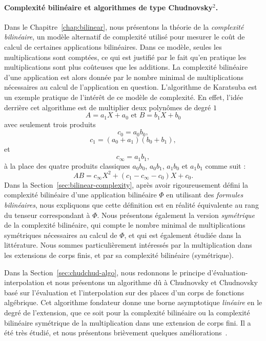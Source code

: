 \paragraph{Complexité bilinéaire et algorithmes de type Chudnovsky$^2$.} Dans le
Chapitre~\ref{chap:bilinear}, nous présentons la théorie de la \emph{complexité
bilinéaire}, un modèle alternatif de complexité utilisé pour mesurer le coût de
calcul de certaines applications bilinéaires. Dans ce modèle, seules les
multiplications sont comptées, ce qui est justifié par le fait qu'en pratique
les multiplications sont plus coûteuses que les additions. La complexité
bilinéaire d'une application est alors donnée par le nombre minimal de
multiplications nécessaires au calcul de l'application en question. L'algorithme
de Karatsuba est un exemple pratique de l'intérêt de ce modèle de complexité. En
effet, l'idée derrière cet algorithme est de multiplier deux polynômes de degré
$1$
\[
  A = a_1 X + a_0\text{ et }B = b_1 X + b_0
\]
avec seulement trois produits
\[
  c_0 = a_0b_0,
\]
\[
  c_1 = (a_0+a_1)(b_0+b_1),
\]
et
\[
  c_\infty = a_1b_1,
\]
à la place des quatre produits classiques $a_0b_0$, $a_0b_1$, $a_1b_0$ et
$a_1b_1$ comme suit :
\[
  AB = c_\infty X^2 + (c_1-c_\infty-c_0) X + c_0.
\]
Dans la Section~\ref{sec:bilinear-complexity}, après avoir rigoureusement
défini la complexité bilinéaire d'une application bilinéaire $\Phi$ en
utilisant des \emph{formules bilinéaires}, nous expliquons que cette définition
est en réalité équivalente au rang du tenseur correspondant à $\Phi$. Nous
présentons également la version \emph{symétrique} de la complexité bilinéaire,
qui compte le nombre minimal de multiplications symétriques nécessaires au
calcul de $\Phi$, et qui est également étudiée dans la littérature. Nous sommes
particulièrement intéressés par la multiplication dans les extensions de corps
finis, et par sa complexité bilinéaire (symétrique).

Dans la Section~\ref{sec:chudchud-algo}, nous redonnons le principe
d'évaluation-interpolation et nous présentons un algorithme dû à Chudnovsky et
Chudnovsky~\cite{CC88} basé sur l'évaluation et l'interpolation sur des places
d'un corps de fonctions algébrique. Cet algorithme fondateur donne une borne
asymptotique \emph{linéaire} en le degré de l'extension, que ce soit pour la
complexité bilinéaire ou la complexité bilinéaire symétrique de la
multiplication dans une extension de corps fini. Il a été très étudié, et nous
présentons brièvement quelques améliorations~\cite{BR04, CO10, Randriam12}.

